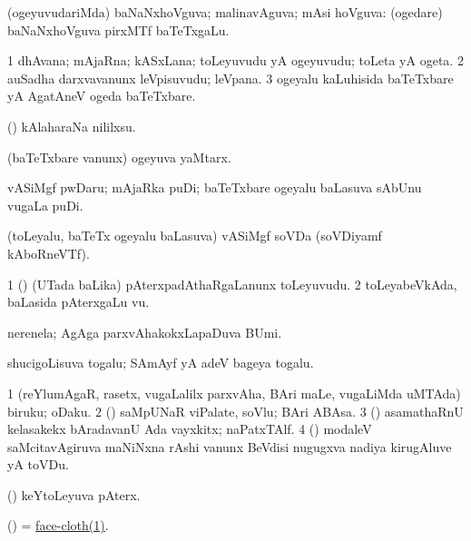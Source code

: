 \bentry 
{} 
\gl{\gu}
\expl{}
\bmng
(ogeyuvudariMda) baNaNxhoVguva; malinavAguva; mAsi hoVguva:  (ogedare) baNaNxhoVguva pirxMTf baTeTxgaLu. 
\emng
\eentry

\bentry 
{} 
\gl{\nA}
\expl{}
\bmng
\bnum
\num{1} dhAvana; mAjaRna; kASxLana; toLeyuvudu yA ogeyuvudu; toLeta yA ogeta. 
\num{2} auSadha darxvavanunx leVpisuvudu; leVpana. 
\num{3} ogeyalu kaLuhisida baTeTxbare yA AgatAneV ogeda baTeTxbare. 
\enum
\emng

\noindent 
\gl{\pagu}
\expl{}
\bmng
{} (\ashi) kAlaharaNa nililxsu. 
\emng
\eentry

\bentry
{} 
\gl{\nA}
\expl{}
\bmng
(baTeTxbare \mo vanunx) ogeyuva yaMtarx. 
\emng
\eentry

\bentry
{} 
\gl{\nA}
\expl{}
\bmng
vASiMgf pwDaru; mAjaRka puDi; baTeTxbare ogeyalu baLasuva sAbUnu \mo vugaLa puDi. 
\emng
\eentry

\bentry
{} 
\gl{\nA}
\expl{}
\bmng
(toLeyalu, baTeTx ogeyalu baLasuva) vASiMgf soVDa (soVDiyamf kAboRneVTf). 
\emng
\eentry

\bentry
{} 
\gl{\nA}
\expl{}
\bmng
\bnum
\num{1} (\birx) (UTada baLika) pAterxpadAthaRgaLanunx toLeyuvudu. 
\num{2} toLeyabeVkAda, baLasida pAterxgaLu \mo vu. 
\enum
\emng
\eentry

\bentry
{} 
\gl{\nA}
\expl{}
\bmng
nerenela; AgAga parxvAhakokxLapaDuva BUmi. 
\emng
\eentry

\bentry
{} 
\gl{\nA}
\expl{}
\bmng
shucigoLisuva togalu; SAmAyf yA adeV bageya togalu. 
\emng
\eentry

\bentry
{} 
\bmng
\bnum
\num{1} (reYlumAgaR, rasetx, \mo vugaLalilx parxvAha, BAri maLe, \mo vugaLiMda uMTAda) biruku; oDaku. 
\num{2} (\AmA) saMpUNaR viPalate, soVlu; BAri ABAsa. 
\num{3} (\ashi) asamathaRnU kelasakekx bAradavanU Ada vayxkitx; naPatxTAlf. 
\num{4} (\BUvi) modaleV saMcitavAgiruva maNiNxna rAshi \mo vanunx BeVdisi nugugxva nadiya kirugAluve yA toVDu. 
\enum
\emng
\eentry

\bentry
{} 
\gl{\nA}
\expl{}
\bmng
(\pArxparx) keYtoLeyuva pAterx. 
\emng
\eentry

\bentry
{} 
\gl{\nA}
\expl{}
\bmng
(\ame) = \hyperref{kandict_f.pdf}{F}{face-cloth(1)}{face-cloth(1)}. 
\emng
\eentry

